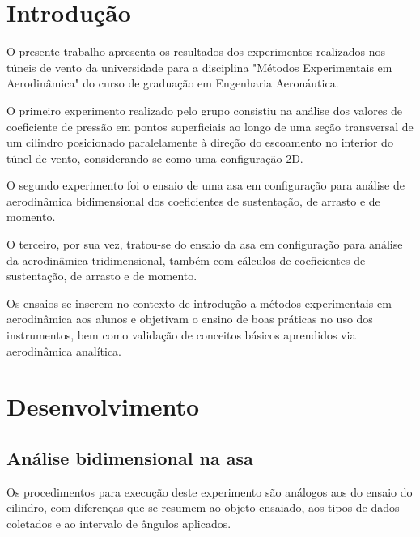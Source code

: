 
\section{Introdução}
O presente trabalho apresenta os resultados dos experimentos realizados nos túneis de vento da universidade para a disciplina "Métodos Experimentais em Aerodinâmica" do curso de graduação em Engenharia Aeronáutica. 

O primeiro experimento realizado pelo grupo consistiu na análise dos valores de coeficiente de pressão em pontos superficiais ao longo de uma seção transversal de um cilindro posicionado paralelamente à direção do escoamento no interior do túnel de vento, considerando-se como uma configuração 2D. 

O segundo experimento foi o ensaio de uma asa em configuração para análise de aerodinâmica bidimensional dos coeficientes de sustentação, de arrasto e de momento. 

O terceiro, por sua vez, tratou-se do ensaio da asa em configuração para análise da aerodinâmica tridimensional, também com cálculos de coeficientes de sustentação, de arrasto e de momento. 

Os ensaios se inserem no contexto de introdução a métodos experimentais em aerodinâmica aos alunos e objetivam o ensino de boas práticas no uso dos instrumentos, bem como validação de conceitos básicos aprendidos via aerodinâmica analítica. 

\section{Desenvolvimento}




\subsection{Análise bidimensional na asa}
Os procedimentos para execução deste experimento são análogos aos do ensaio do cilindro, com diferenças que se resumem ao objeto ensaiado, aos tipos de dados coletados e ao intervalo de ângulos aplicados. 

